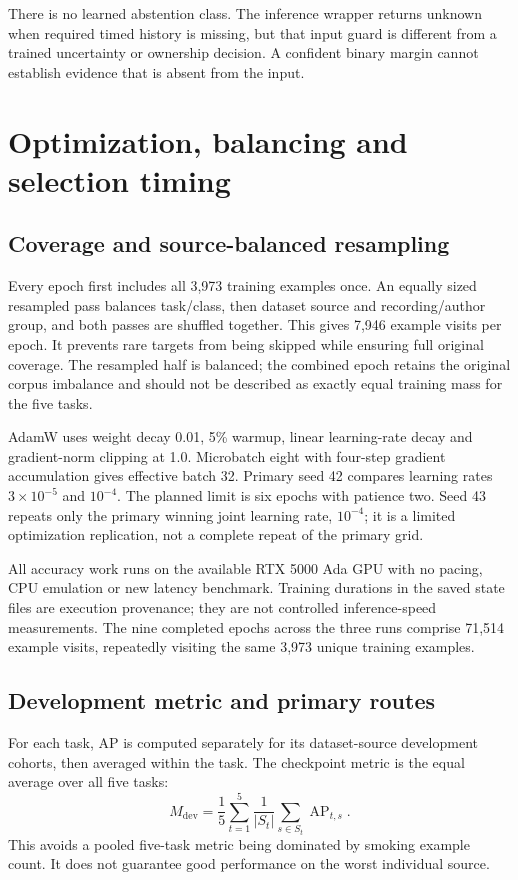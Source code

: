 There is no learned abstention class. The inference wrapper returns unknown when required timed history is missing, but that input guard is different from a trained uncertainty or ownership decision. A confident binary margin cannot establish evidence that is absent from the input.



\section{Optimization, balancing and selection timing}
\subsection{Coverage and source-balanced resampling}
Every epoch first includes all 3,973 training examples once. An equally sized resampled pass balances task/class, then dataset source and recording/author group, and both passes are shuffled together. This gives 7,946 example visits per epoch. It prevents rare targets from being skipped while ensuring full original coverage. The resampled half is balanced; the combined epoch retains the original corpus imbalance and should not be described as exactly equal training mass for the five tasks.

AdamW uses weight decay 0.01, 5\% warmup, linear learning-rate decay and gradient-norm clipping at 1.0. Microbatch eight with four-step gradient accumulation gives effective batch 32. Primary seed 42 compares learning rates $3\times10^{-5}$ and $10^{-4}$. The planned limit is six epochs with patience two. Seed 43 repeats only the primary winning joint learning rate, $10^{-4}$; it is a limited optimization replication, not a complete repeat of the primary grid.

All accuracy work runs on the available RTX 5000 Ada GPU with no pacing, CPU emulation or new latency benchmark. Training durations in the saved state files are execution provenance; they are not controlled inference-speed measurements. The nine completed epochs across the three runs comprise 71,514 example visits, repeatedly visiting the same 3,973 unique training examples.

\subsection{Development metric and primary routes}
For each task, AP is computed separately for its dataset-source development cohorts, then averaged within the task. The checkpoint metric is the equal average over all five tasks:
\begin{equation}
M_{\mathrm{dev}}=\frac{1}{5}\sum_{t=1}^{5}
\frac{1}{|S_t|}\sum_{s\in S_t}\operatorname{AP}_{t,s}.
\end{equation}
This avoids a pooled five-task metric being dominated by smoking example count. It does not guarantee good performance on the worst individual source.

